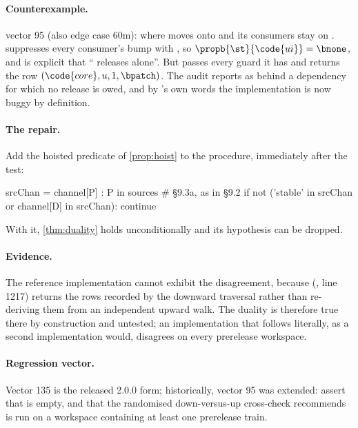 \paragraph{Counterexample.} \SPEC{} vector 95 (also edge case 60m):
 where  moves onto  and its
consumers stay on .  suppresses every consumer's bump
with , so $\propb{\st}{\code{ui}} = \bnone$, and \SPEC{} is
explicit that `` releases  alone''. But
 passes every guard it has and returns the row
$(\code{core}, u, 1, \bpatch)$. The audit reports  as behind a
dependency for which no release is owed, and by 's own words the
implementation is now buggy by definition.

\paragraph{The repair.} Add the hoisted predicate of \cref{prop:hoist} to the
procedure, immediately after the  test:
\begin{speccode}
        srcChan = { channel[P] : P in sources }        # §9.3a, as in §9.2
        if not ('stable' in srcChan or channel[D] in srcChan):  continue
\end{speccode}
With it, \cref{thm:duality} holds unconditionally and its hypothesis can be
dropped.

\paragraph{Evidence.} The reference implementation cannot exhibit the
disagreement, because 
(, line 1217) returns the rows
recorded by the downward traversal rather than re-deriving them from an
independent upward walk. The duality is therefore true there by construction
and untested; an implementation that follows  literally, as a
second implementation would, disagrees on every prerelease workspace.

\paragraph{Regression vector.} Vector 135 is the released 2.0.0 form; historically, vector 95 was extended: assert that
 is empty, and that the randomised
down-versus-up cross-check  recommends is run on a workspace
containing at least one prerelease train.

